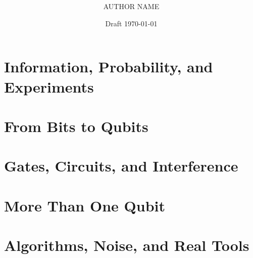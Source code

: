 \documentclass[11pt,openany]{book}
\title{\booktitle\\[4pt]\large\booksubtitle}
\author{AUTHOR NAME}
\date{Draft \today}
\begin{document}
\frontmatter
\maketitle


\tableofcontents


\mainmatter
\part{Information, Probability, and Experiments}



\part{From Bits to Qubits}



\part{Gates, Circuits, and Interference}




\part{More Than One Qubit}




\part{Algorithms, Noise, and Real Tools}




\appendix









% 
% 
\end{document}
